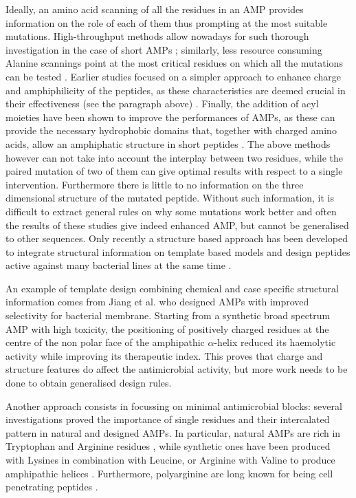 Ideally, an amino acid scanning of all the residues in an AMP provides information on the role of each of them thus prompting at the most suitable mutations. High-throughput methods allow nowadays for such thorough investigation in the case of short AMPs \cite{Hilpert2005,Hilpert2006}; similarly, less resource consuming Alanine scannings point at the most critical residues on which all the mutations can be tested \cite{Migon2018,Grieco2011,Xie2018}.
%
Earlier studies focused on a simpler approach to enhance charge and amphiphilicity of the peptides, as these characteristics are deemed crucial in their effectiveness (see the paragraph above) \cite{Wiradharma2011,Huang2010,Pag2008,Wang2015}.
%
Finally, the addition of acyl moieties have been shown to improve the performances of AMPs, as these can provide the necessary hydrophobic domains that, together with charged amino acids, allow an amphiphatic structure in short pep­tides \cite{Radzishevsky2005,Serrano2009,Avrahami2004}.
%
The above methods however can not take into account the interplay between two residues, while the paired mutation of two of them can give optimal results with respect to a single intervention. Furthermore
there is little to no information on the three dimensional structure of the mutated peptide. Without such information, it is difficult to extract general rules on why some mutations work better and often the results of these studies give indeed enhanced AMP, but cannot be generalised to other sequences.
%
Only recently a structure based approach has been developed to integrate structural information on template based models and design peptides active against many bacterial lines at the same time \cite{Liu2018}.

An example of template design combining chemical and case specific structural information comes from Jiang et al. \cite{Jiang2011} who designed AMPs with improved selectivity for bacterial membrane. Starting from a synthetic broad spectrum AMP with high toxicity, the positioning of positively charged residues at the centre of the non ­polar face of the amphipathic $\alpha$-helix reduced its haemolytic activity while improving its therapeutic index. This proves that charge and structure features do affect the antimicrobial activity, but more work needs to be done to obtain generalised design rules.

Another approach consists in focussing on minimal antimicrobial blocks: several investigations proved the importance of single residues and their intercalated pattern in natural and designed AMPs. In particular, natural AMPs are rich in Tryptophan and Arginine residues \cite{Chan2006}, while synthetic ones have been produced with Lysines in combination with Leucine, or Arginine with Valine to produce amphi­pathic helices \cite{Deslouches2005}. Furthermore, polyarginine are long known for being cell penetrating peptides \cite{Schmidt2010}.




